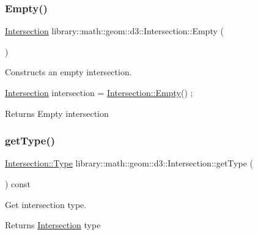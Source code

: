 \subsubsection{\texorpdfstring{Empty()}{Empty()}}
{\footnotesize\ttfamily \hyperlink{classlibrary_1_1math_1_1geom_1_1d3_1_1_intersection}{Intersection} library\+::math\+::geom\+::d3\+::\+Intersection\+::\+Empty (\begin{DoxyParamCaption}{ }\end{DoxyParamCaption})\hspace{0.3cm}{\ttfamily [static]}}



Constructs an empty intersection. 


\begin{DoxyCode}
\hyperlink{classlibrary_1_1math_1_1geom_1_1d3_1_1_intersection_afbaef540a058ccc7e58f1be2585304a9}{Intersection} intersection = \hyperlink{classlibrary_1_1math_1_1geom_1_1d3_1_1_intersection_af0f1aed5c97a5142a4b20cb8edcb78e0}{Intersection::Empty}() ;
\end{DoxyCode}


\begin{DoxyReturn}{Returns}
Empty intersection 
\end{DoxyReturn}
\mbox{\label{classlibrary_1_1math_1_1geom_1_1d3_1_1_intersection_aead6925dc35a2f6aec30373ca1556600}} 
\subsubsection{\texorpdfstring{get\+Type()}{getType()}}
{\footnotesize\ttfamily \hyperlink{classlibrary_1_1math_1_1geom_1_1d3_1_1_intersection_a3465d607fd42380f350598e055271b05}{Intersection\+::\+Type} library\+::math\+::geom\+::d3\+::\+Intersection\+::get\+Type (\begin{DoxyParamCaption}{ }\end{DoxyParamCaption}) const}



Get intersection type. 

\begin{DoxyReturn}{Returns}
\hyperlink{classlibrary_1_1math_1_1geom_1_1d3_1_1_intersection}{Intersection} type 
\end{DoxyReturn}
\mbox{\label{classlibrary_1_1math_1_1geom_1_1d3_1_1_intersection_a9e7c3d0568a6c9a29ba3503751166932}} 
